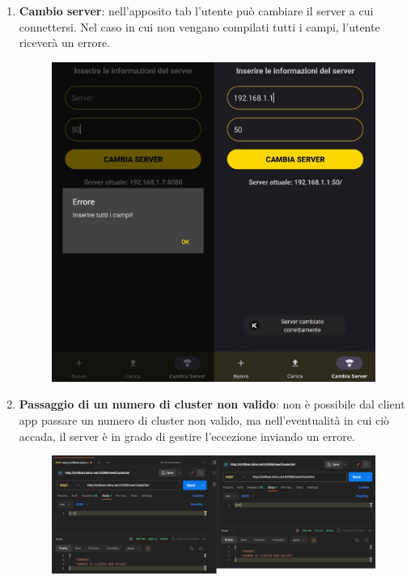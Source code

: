 \begin{enumerate}
\begin{figure}[H]
  \end{figure}
  \item \textbf{Cambio server}: nell'apposito tab l'utente può cambiare il server a cui connettersi. Nel caso in cui non vengano compilati tutti i campi, l'utente riceverà un errore.
  \begin{figure}[H]
    \centering
    \includegraphics[scale=0.35]{img/app11.png}
  \end{figure}
  \item \textbf{Passaggio di un numero di cluster non valido}: non è possibile dal client app passare un numero di cluster non valido, ma nell'eventualità in cui ciò accada, il server è in grado di gestire l'eccezione inviando un errore.
  \begin{figure}[H]
    \centering
    \includegraphics[scale=0.4]{img/app12.png}
  \end{figure}
\end{enumerate}